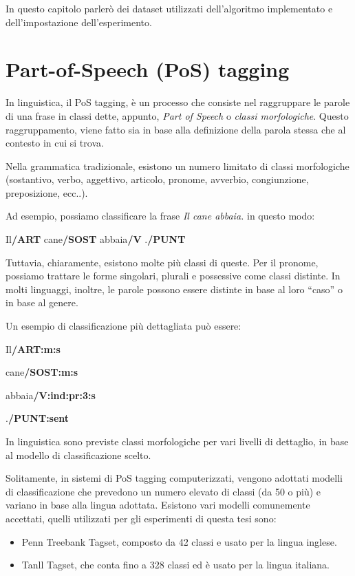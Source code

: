 In questo capitolo parler\`o dei dataset utilizzati dell'algoritmo implementato e dell'impostazione dell'esperimento.

\section{Part-of-Speech (PoS) tagging}
In linguistica, il PoS tagging, \`e un processo che consiste nel raggruppare le parole di una frase in classi dette, appunto, \emph{Part of Speech} o \emph{classi morfologiche}.
Questo raggruppamento, viene fatto sia in base alla definizione della parola stessa che al contesto in cui si trova.

Nella grammatica tradizionale, esistono un numero limitato di classi morfologiche (sostantivo, verbo, aggettivo, articolo, pronome, avverbio, congiunzione, preposizione, ecc..).

Ad esempio, possiamo classificare la frase \emph{Il cane abbaia.} in questo modo:

\centerline{Il\textbf{/ART} cane\textbf{/SOST} abbaia\textbf{/V} .\textbf{/PUNT}}

Tuttavia, chiaramente, esistono molte pi\`u classi di queste.
Per il pronome, possiamo trattare le forme singolari, plurali e possessive come classi distinte.
In molti linguaggi, inoltre, le parole possono essere distinte in base al loro ``caso'' o in base al genere.

Un esempio di classificazione pi\`u dettagliata pu\`o essere:

\begin{center}
Il\textbf{/ART:m:s}

cane\textbf{/SOST:m:s}

abbaia\textbf{/V:ind:pr:3:s}

.\textbf{/PUNT:sent}
\end{center}

In linguistica sono previste classi morfologiche per vari livelli di dettaglio, in base al modello di classificazione scelto.

Solitamente, in sistemi di PoS tagging computerizzati, vengono adottati modelli di classificazione che prevedono un numero elevato di classi (da 50 o pi\`u) e variano in base alla lingua adottata.
Esistono vari modelli comunemente accettati, quelli utilizzati per gli esperimenti di questa tesi sono:
\begin{itemize}
  \item Penn Treebank Tagset, composto da 42 classi e usato per la lingua inglese.
  \item Tanll Tagset, che conta fino a 328 classi ed \`e usato per la lingua italiana.
\end{itemize}

